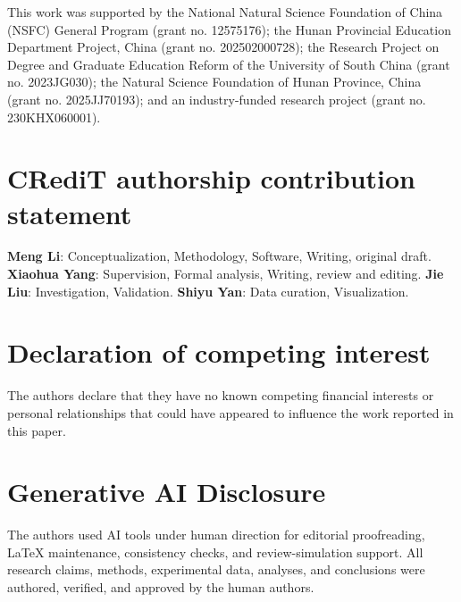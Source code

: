 \documentclass[manuscript,screen,review]{acmart}
\begin{document}
This work was supported by the National Natural Science Foundation of China
(NSFC) General Program (grant no. 12575176); the Hunan Provincial Education
Department Project, China (grant no. 202502000728); the Research Project on
Degree and Graduate Education Reform of the University of South China (grant
no. 2023JG030); the Natural Science Foundation of Hunan Province, China (grant
no. 2025JJ70193); and an industry-funded research project (grant no.
230KHX060001).

\section*{CRediT authorship contribution statement}

\textbf{Meng Li}: Conceptualization, Methodology, Software, Writing, original
draft. \textbf{Xiaohua Yang}: Supervision, Formal analysis, Writing, review
and editing. \textbf{Jie Liu}: Investigation, Validation. \textbf{Shiyu Yan}:
Data curation, Visualization.

\section*{Declaration of competing interest}

The authors declare that they have no known competing financial interests or
personal relationships that could have appeared to influence the work reported
in this paper.

\section*{Generative AI Disclosure}

The authors used AI tools under human direction for editorial proofreading,
LaTeX maintenance, consistency checks, and review-simulation support. All
research claims, methods, experimental data, analyses, and conclusions were
authored, verified, and approved by the human authors.



\end{document}
